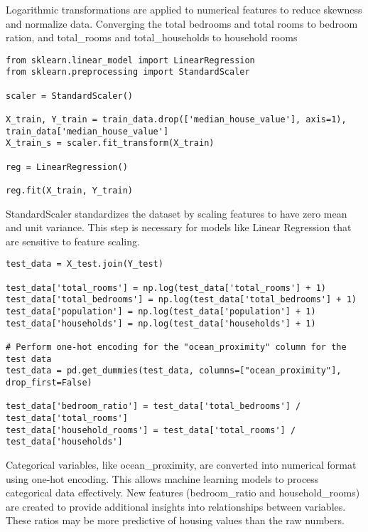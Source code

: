 \documentclass{article}
\begin{document}
\begin{center}Logarithmic transformations are applied to numerical features to reduce skewness and normalize data. Converging the total bedrooms and total rooms to bedroom ration, and total\_rooms and total\_households to household rooms
\end{center}

\begin{verbatim}
from sklearn.linear_model import LinearRegression
from sklearn.preprocessing import StandardScaler

scaler = StandardScaler()

X_train, Y_train = train_data.drop(['median_house_value'], axis=1), train_data['median_house_value']
X_train_s = scaler.fit_transform(X_train)

reg = LinearRegression()

reg.fit(X_train, Y_train)
\end{verbatim}

\begin{center}
StandardScaler standardizes the dataset by scaling features to have zero mean and unit variance. This step is necessary for models like Linear Regression that are sensitive to feature scaling.
\end{center}


\begin{verbatim}
test_data = X_test.join(Y_test)

test_data['total_rooms'] = np.log(test_data['total_rooms'] + 1)
test_data['total_bedrooms'] = np.log(test_data['total_bedrooms'] + 1)
test_data['population'] = np.log(test_data['population'] + 1)
test_data['households'] = np.log(test_data['households'] + 1)

# Perform one-hot encoding for the "ocean_proximity" column for the test data
test_data = pd.get_dummies(test_data, columns=["ocean_proximity"], drop_first=False)

test_data['bedroom_ratio'] = test_data['total_bedrooms'] / test_data['total_rooms']
test_data['household_rooms'] = test_data['total_rooms'] / test_data['households']
\end{verbatim}

\begin{center}Categorical variables, like ocean\_proximity, are converted into numerical format using one-hot encoding. This allows machine learning models to process categorical data effectively. New features (bedroom\_ratio and household\_rooms) are created to provide additional insights into relationships between variables. These ratios may be more predictive of housing values than the raw numbers.
\end{center}
\end{document}
